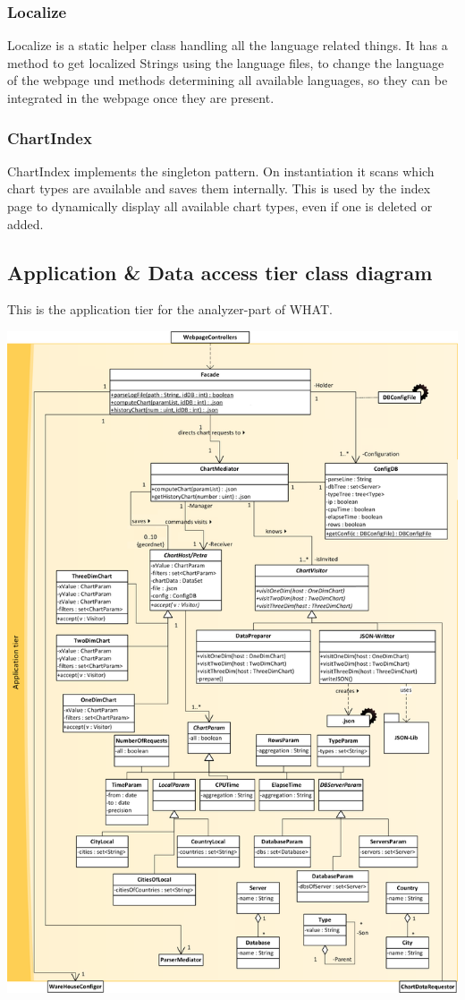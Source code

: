 \subsubsection*{Localize}
Localize is a static helper class handling all the language related things. 
It has a method to get localized Strings using the language files, 
to change the language of the webpage und methods determining all available languages, 
so they can be integrated in the webpage once they are present.

\subsubsection*{ChartIndex}
ChartIndex implements the singleton pattern. On instantiation it scans which chart types are available 
and saves them internally. This is used by the index page to dynamically display all available chart types,
even if one is deleted or added.


\subsection{Application \& Data access tier class diagram}
This is the application tier for the analyzer-part of WHAT. 
\newpage
\begin{center}
\includegraphics[width=0.9\linewidth]{Pictures/AppTierDia1.png}
\end{center}  

